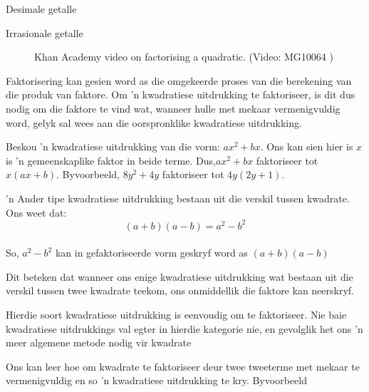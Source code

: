 \begin{Aktiwiteit}{Desimale getalle}
\begin{aktiwiteit}{Irrasionale getalle}
\setcounter{subfigure}{0}
\begin{figure}[H] %
\textnormal{Khan Academy video on factorising a quadratic.}\vspace{.1in} \nopagebreak
\label{m39394*yt-media2}\label{m39394*yt-video2}
 { (Video:  MG10064 )}
\vspace{2pt}
\vspace{.1in}
\end{figure}       
Faktorisering kan gesien word as die omgekeerde proses van die berekening van die produk van faktore. Om
’n kwadratiese uitdrukking te faktoriseer, is dit dus nodig om die faktore te vind wat, wanneer hulle met mekaar
vermenigvuldig word, gelyk sal wees aan die oorspronklike kwadratiese uitdrukking.\par 

Beskou ’n kwadratiese uitdrukking van die vorm: $a{x}^{2}+bx$. Ons kan sien hier is  $x$ is ’n gemeenskaplike faktor in
beide terme. Dus,$a{x}^{2}+bx$  faktoriseer tot $x(ax+b)$. Byvoorbeeld, $8{y}^{2}+4y$ faktoriseer tot  $4y(2y+1)$.\par 
’n Ander tipe kwadratiese uitdrukking bestaan uit die verskil tussen kwadrate. Ons weet dat:
\begin{equation*}
(a+b)(a-b)={a}^{2}-{b}^{2}
\end{equation*}
\\ 
So, $a^2-b^2$ kan in gefaktoriseerde vorm geskryf word as $(a+b)(a-b)$ \par


Dit beteken dat wanneer ons enige kwadratiese uitdrukking wat bestaan uit die verskil tussen twee kwadrate teekom, ons onmiddellik die faktore kan neerskryf.


Hierdie soort kwadratiese uitdrukking is eenvoudig om te faktoriseer. Nie baie kwadratiese uitdrukkings val egter
in hierdie kategorie nie, en gevolglik het ons ’n meer algemene metode nodig vir kwadrate
\par 
Ons kan leer hoe om kwadrate te faktoriseer deur twee tweeterme met mekaar te vermenigvuldig en so ’n kwadratiese uitdrukking te kry. Byvoorbeeld


\end{aktiwiteit}
\end{Aktiwiteit}
